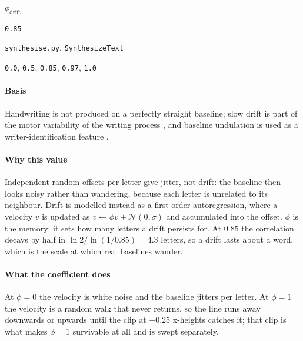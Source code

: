 \label{coef:drift-persistence}

\begin{description}[leftmargin=5.2em,style=sameline]

\item[Symbol] $\phi_{\text{drift}}$

\item[Value] \texttt{0.85}

\item[Source] \texttt{synthesise.py}, \texttt{SynthesizeText}

\item[Swept] \texttt{0.0}, \texttt{0.5}, \texttt{0.85}, \texttt{0.97}, \texttt{1.0}

\end{description}

\paragraph{Basis}

Handwriting is not produced on a perfectly straight baseline; slow drift is part of the motor variability of the writing process \cite{plamondon2000}, and baseline undulation is used as a writer-identification feature \cite{bulacu2007}.

\paragraph{Why this value}

Independent random offsets per letter give jitter, not drift: the baseline then looks noisy rather than wandering, because each letter is unrelated to its neighbour. Drift is modelled instead as a first-order autoregression, where a velocity $v$ is updated as $v \leftarrow \phi v + \mathcal{N}(0,\sigma)$ and accumulated into the offset. $\phi$ is the memory: it sets how many letters a drift persists for. At $0.85$ the correlation decays by half in $\ln 2/\ln(1/0.85) = 4.3$ letters, so a drift lasts about a word, which is the scale at which real baselines wander.

\paragraph{What the coefficient does}

At $\phi = 0$ the velocity is white noise and the baseline jitters per letter. At $\phi = 1$ the velocity is a random walk that never returns, so the line runs away downwards or upwards until the clip at $\pm 0.25$ x-heights catches it; that clip is what makes $\phi = 1$ survivable at all and is swept separately.

